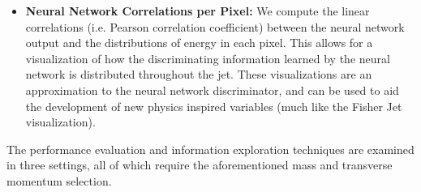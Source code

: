 \begin{itemize}
\item \textbf{Neural Network Correlations per Pixel:}  We compute the linear correlations (i.e. Pearson correlation coefficient) between the neural network output and the distributions of energy in each pixel.  This allows for a visualization of how the discriminating information learned by the neural network is distributed throughout the jet.  These visualizations are an approximation to the neural network discriminator, and can be used to aid the development of new physics inspired variables (much like the Fisher Jet visualization).

\end{itemize}


The performance evaluation and information exploration techniques are examined in three settings, all of which require the aforementioned mass and transverse momentum selection.
